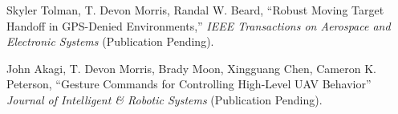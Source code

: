 

\begin{cvparagraph}
  Skyler Tolman, T. Devon Morris, Randal W. Beard, ``Robust Moving Target Handoff in GPS-Denied Environments,'' \textit{IEEE Transactions on Aerospace and Electronic Systems} (Publication Pending).

  John Akagi, T. Devon Morris, Brady Moon, Xingguang Chen, Cameron K. Peterson, ``Gesture Commands for Controlling High-Level UAV Behavior'' \textit{Journal of Intelligent \& Robotic Systems} (Publication Pending).
\end{cvparagraph}

